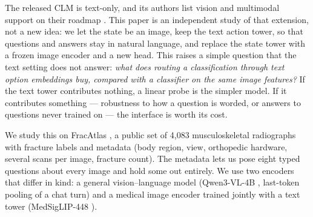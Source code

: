 \documentclass[11pt]{article}
\begin{document}
The released CLM is text-only, and its authors list vision and multimodal support on their roadmap
\citep{kwok2026clm}. This paper is an independent study of that extension, not a new idea: we let the state be an
image, keep the text action tower, so that questions and answers stay in natural language, and replace the state
tower with a frozen image encoder and a new head. This raises a simple question that the text setting does not answer: \emph{what does routing a
classification through text option embeddings buy, compared with a classifier on the same image features?} If the
text tower contributes nothing, a linear probe is the simpler model. If it contributes something --- robustness to
how a question is worded, or answers to questions never trained on --- the interface is worth its cost.

We study this on FracAtlas \citep{abedeen2023fracatlas}, a public set of 4{,}083 musculoskeletal radiographs with
fracture labels and metadata (body region, view, orthopedic hardware, several scans per image, fracture count). The
metadata lets us pose eight typed questions about every image and hold some out entirely. We use two encoders that
differ in kind: a general vision--language model (Qwen3-VL-4B \citep{qwen2025qwen3vl}, last-token pooling of a chat turn) and a medical
image encoder trained jointly with a text tower (MedSigLIP-448 \citep{sellergren2025medgemma}).
\end{document}
